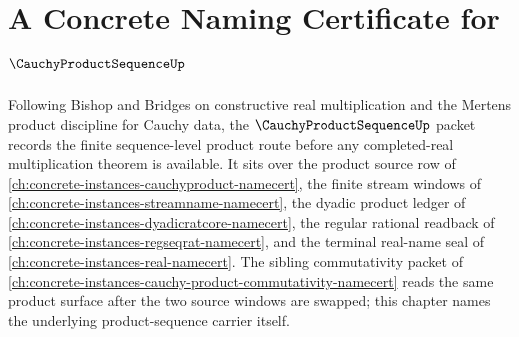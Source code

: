 \chapter{A Concrete Naming Certificate for $\CauchyProductSequenceUp$}
\label{ch:concrete-instances-cauchy-product-sequence-namecert}

Following Bishop and Bridges on constructive real multiplication and the Mertens product discipline for Cauchy data, the $\CauchyProductSequenceUp$ packet records the finite sequence-level product route before any completed-real multiplication theorem is available. It sits over the product source row of \autoref{ch:concrete-instances-cauchyproduct-namecert}, the finite stream windows of \autoref{ch:concrete-instances-streamname-namecert}, the dyadic product ledger of \autoref{ch:concrete-instances-dyadicratcore-namecert}, the regular rational readback of \autoref{ch:concrete-instances-regseqrat-namecert}, and the terminal real-name seal of \autoref{ch:concrete-instances-real-namecert}. The sibling commutativity packet of \autoref{ch:concrete-instances-cauchy-product-commutativity-namecert} reads the same product surface after the two source windows are swapped; this chapter names the underlying product-sequence carrier itself.

